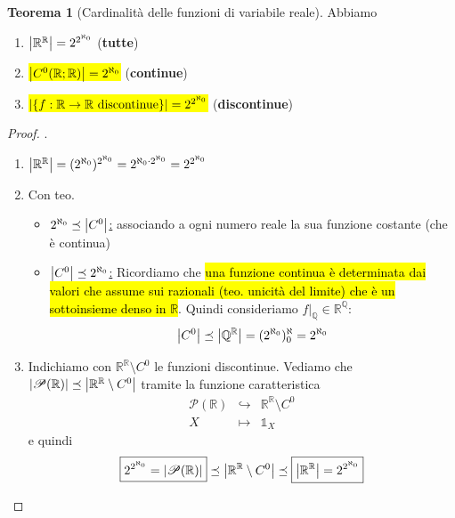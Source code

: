 \documentclass[a4paper,10pt]{article}
\theoremstyle{definition}
\newcommand{\qu}{\mathbb{Q}} %
\newcommand{\re}{\mathbb{R}} %
\theoremstyle{indentdefinition}
\theoremstyle{indentpostulate}
\theoremstyle{indenttheorem}
\newtheorem{thm}{Teorema}[section]
\theoremstyle{myremark}
\theoremstyle{indentgeneral}
\newenvironment{myboxed} 
{\noindent\begin{lrbox}{\mybox}\begin{minipage}{\textwidth}}
{\end{minipage}\end{lrbox}\fbox{\usebox{\mybox}}}
\begin{document}
\begin{myboxed}
\begin{thm}[Cardinalità delle funzioni di variabile reale] Abbiamo
\begin{enumerate}
    \item $\abs{\re^\re}=2^{2^{\aleph_0}}$ (\textbf{tutte})
    \item \hl{$\abs{C^0(\re;\re)}=2^{\aleph_0}$} (\textbf{continue})
    \item \hl{$\abs{\{f:\re\to\re\text{ discontinue}\}}=2^{2^{\aleph_0}}$} (\textbf{discontinue})
\end{enumerate}    
\end{thm}
\end{myboxed}
\begin{proof}.
\begin{enumerate}
    \item $\abs{\re^{\re}}=(2^{\aleph_0})^{2^{\aleph_0}}=2^{\aleph_0\cdot2^{\aleph_0}}=2^{2^{\aleph_0}}$
    \item Con teo. 
    \begin{itemize}
        \item \underline{$2^{\aleph_0}\preceq\abs{C^0}$:} associando a ogni numero reale la sua funzione costante (che è continua)
        \item \underline{$\abs{C^0}\preceq2^{\aleph_0}$:} Ricordiamo che \hl{una funzione continua è determinata dai valori che assume sui razionali (teo. unicità del limite) che è un sottoinsieme denso in $\re$}. Quindi consideriamo $f|_\qu\in\re^\qu$:
        $$\abs{C^0}\preceq\abs{\qu^\re}=(2^{\aleph_0})^\aleph_0=2^{\aleph_0}$$
        \end{itemize}
 \item Indichiamo con $\re^\re\setminus C^0$ le funzioni discontinue. Vediamo che $\abs{\mathscr{P}(\re)}\preceq\abs{\re^\re\setminus C^0}$ tramite la funzione caratteristica
        $$\begin{array}{ccc}
             \mathscr{P}(\re)  & \hookrightarrow & \re^\re\setminus C^0  \\
              X &\mapsto & \mathds{1}_X
           \end{array}$$
        e quindi
        $$\boxed{2^{2^{\aleph_0}}=\abs{\mathscr{P}(\re)}}\preceq\abs{ \re^\re\setminus C^0}\preceq\boxed{\abs{\re^\re}=2^{2^{\aleph_0}}}$$
    
\end{enumerate}
\end{proof}
\end{document}
